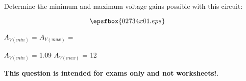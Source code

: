 

Determine the minimum and maximum voltage gains possible with this circuit:

$$\epsfbox{02734x01.eps}$$

$A_{V(min)}$ = \hskip 80pt $A_{V(max)}$ =







$A_{V(min)}$ = 1.09 \hskip 30pt $A_{V(max)}$ = 12







{\bf This question is intended for exams only and not worksheets!}.




